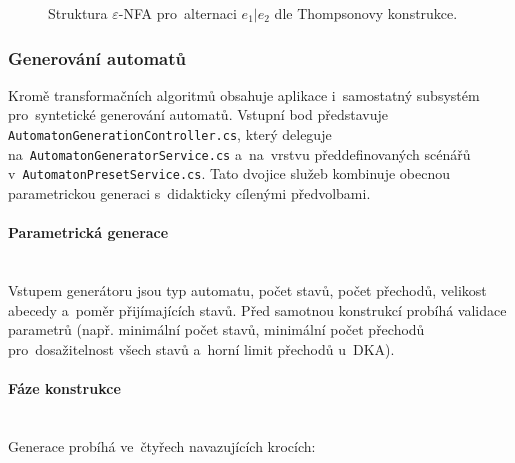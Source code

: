 \documentclass[
  master,
  program=ainfvs,
  printversion,
  figures=false,
  tables=false,
  glossaries,
  index
]{kidiplom}
\begin{document}
\begin{figure}[H]
    \centering
    \caption{Struktura $\varepsilon$-NFA pro~alternaci $e_1 | e_2$ dle Thompsonovy konstrukce.}
    \label{fig:thompson_or}
\end{figure}

\subsubsection{Generování automatů}

Kromě transformačních algoritmů obsahuje aplikace i~samostatný subsystém pro~syntetické generování automatů. Vstupní bod představuje \texttt{Automaton\-Generation\-Controller.cs}, který deleguje na~\texttt{Automaton\-Generator\-Service.cs} a~na~vrstvu předdefinovaných scénářů v~\texttt{AutomatonPreset\-Ser\-vi\-ce.cs}. Tato dvojice služeb kombinuje obecnou parametrickou generaci s~didakticky cílenými předvolbami.

\paragraph{Parametrická generace} \mbox{} \\
Vstupem generátoru jsou typ automatu, počet stavů, počet přechodů, velikost abecedy a~poměr přijímajících stavů. Před samotnou konstrukcí probíhá validace parametrů (např. minimální počet stavů, minimální počet přechodů pro~dosažitelnost všech stavů a~horní limit přechodů u~\gls{DKA}).

\paragraph{Fáze konstrukce} \mbox{} \\
Generace probíhá ve~čtyřech navazujících krocích:
\end{document}

